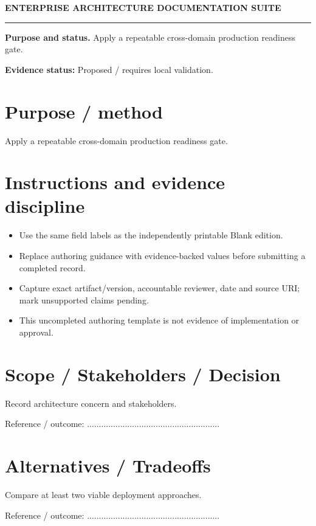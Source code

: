\documentclass[10pt,letterpaper]{article}
\begin{document}
\begin{center}
{\large\bfseries\color{teal} ENTERPRISE ARCHITECTURE DOCUMENTATION SUITE}\par
{}\par
{}\par
\end{center}
\vspace{8pt}\hrule\vspace{12pt}
\textbf{Purpose and status.} Apply a repeatable cross-domain production readiness gate.\par
\textbf{Evidence status:} Proposed / requires local validation.\par
\section{Purpose / method}
Apply a repeatable cross-domain production readiness gate.\par
\section{Instructions and evidence discipline}
\begin{itemize}
\item Use the same field labels as the independently printable Blank edition.
\item Replace authoring guidance with evidence-backed values before submitting a completed record.
\item Capture exact artifact/version, accountable reviewer, date and source URI; mark unsupported claims pending.
\item This uncompleted authoring template is not evidence of implementation or approval.
\end{itemize}
\section{Scope / Stakeholders / Decision}
Record architecture concern and stakeholders.\par
Reference / outcome: ........................................................\par
\section{Alternatives / Tradeoffs}
Compare at least two viable deployment approaches.\par
Reference / outcome: ........................................................\par
\end{document}
